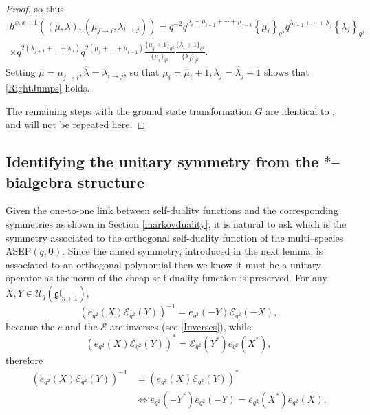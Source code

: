 \documentclass{ximera}
\begin{document}
\begin{proof}
so thus
\begin{multline*}
h^{x, x+1}\left((\mu, \lambda), \left(\mu_{j \rightarrow i}, \lambda_{i \rightarrow j}\right)\right) 
= q^{-2} q^{\mu_{i}+\mu_{i+1}+\cdots+\mu_{j-1}}\left\{\mu_{i}\right\}_{q^{2}} q^{\lambda_{i+1}+\cdots+\lambda_{j}}\left\{\lambda_{j}\right\}_{q^{2}} \\ \times q^{2\left(\lambda_{j+1}+\ldots+\lambda_{n}\right)}  q^{2\left(\mu_{1}+\ldots+\mu_{i-1}\right)} 
 \frac{\{\mu_{j}+1\}_{q^2}}{  \{\mu_i\}_{q^2}  }    \frac{ \{\lambda_i +1\}_{q^2}}{ \{\lambda_j\}_{q^2}} .
\end{multline*}
Setting $\hat{\mu}= \mu_{j\rightarrow i}, \hat{\lambda}=\lambda_{i\rightarrow j}$, so that $\mu_i = \hat{\mu}_i+1,\lambda_j = \hat{\lambda}_j+1$ shows that \eqref{RightJumps} holds. 


The remaining steps with the ground state transformation $G$ are identical to \cite{Kuan-IMRN}, and will not be repeated here.


\end{proof}

\subsection{Identifying the unitary symmetry from the $*$--bialgebra structure }
Given the one-to-one link between self-duality functions and the corresponding symmetries as shown in Section \ref{markovduality}, it is natural to ask which is the symmetry associated to the orthogonal self-duality function of the multi--species ASEP$(q,\boldsymbol\theta)$. Since the aimed symmetry, introduced in the next lemma, is associated to an orthogonal polynomial then we know it must be a unitary operator as the norm of the cheap self-duality function is preserved. 
For any $X ,Y \in \mathcal{U}_q(\mathfrak{gl}_{n+1})$, 
$$
\left(e_{q^2}(X)\mathcal{E}_{q^2}(Y)\right)^{-1} = e_{q^2}(-Y)\mathcal{E}_{q^2}(-X),
$$
because the $e$ and the  $\mathcal{E}$ are inverses (see \eqref{Inverses}), while
$$
\left(e_{q^2}(X)\mathcal{E}_{q^2}(Y)\right)^{*} = \mathcal{E}_{q^2}(Y^*)e_{q^2}(X^*),
$$
therefore
\begin{align*}
\left(e_{q^2}(X)\mathcal{E}_{q^2}(Y)\right)^{-1} & = \left(e_{q^2}(X)\mathcal{E}_{q^2}(Y)\right)^{*}  \\ & \Longleftrightarrow e_{q^2}(-Y^*) e_{q^2}(-Y) =  e_{q^2}(X^*)e_{q^2}(X).
\end{align*}
\end{document}
